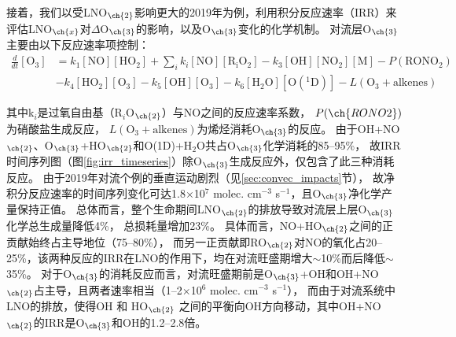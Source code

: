 
接着，我们以受LNO$_{\ch{2}}$影响更大的2019年为例，利用积分反应速率（IRR）来评估LNO$_{\ch{x}}$对$\Delta$O$_{\ch{3}}$的影响，以及O$_{\ch{3}}$变化的化学机制。
对流层O$_{\ch{3}}$主要由以下反应速率项控制\citep{Mazzuca.2016}：
{
\abovedisplayskip=3pt%
\belowdisplayskip=3pt%
\begingroup
\allowdisplaybreaks
\begin{align}
  \frac{d}{dt}[\mathrm{O_3}] &= k_1[\mathrm{NO}][\mathrm{HO_2}] + \sum_{i}  k_i[\mathrm{NO}][\mathrm{R_iO_2}] - k_3[\mathrm{OH}][\mathrm{NO_2}][\mathrm{M}] - P(\mathrm{RONO_2}) \nonumber \\
                             & - k_4[\mathrm{HO_2}][\mathrm{O_3}] - k_5[\mathrm{OH}][\mathrm{O_3}] - k_6[\mathrm{H_2O}][\mathrm{O(^1D)}] - L(\mathrm{O_3+alkenes})
\end{align}
\endgroup
}

其中k$_i$是过氧自由基（R$_i$O$_{\ch{2}}$）与NO之间的反应速率系数，
$P(\ch{RONO2})$为硝酸盐生成反应，
$L(\mathrm{O_3+alkenes})$为烯烃消耗O$_{\ch{3}}$的反应。
由于OH+NO$_{\ch{2}}$、O$_{\ch{3}}$+HO$_{\ch{2}}$和O(1D)+H$_2$O共占O$_{\ch{3}}$化学消耗的85--95\%，
故IRR时间序列图（图\ref{fig:irr_timeseries}）除O$_{\ch{3}}$生成反应外，仅包含了此三种消耗反应。
由于2019年对流个例的垂直运动剧烈（见\ref{sec:convec_impacts}节），
故净积分反应速率的时间序列变化可达1.8$\times$10$^7$ molec. cm$^{-3}$ s$^{-1}$，且O$_{\ch{3}}$净化学产量保持正值。
总体而言，整个生命期间LNO$_{\ch{2}}$的排放导致对流层上层O$_{\ch{3}}$化学总生成量降低4\%，
总损耗量增加23\%。
具体而言，NO+HO$_{\ch{2}}$之间的正贡献始终占主导地位（75--80\%），
而另一正贡献即RO$_{\ch{2}}$对NO的氧化占20--25\%，该两种反应的IRR在LNO的作用下，均在对流旺盛期增大$\sim$10\%而后降低$\sim$35\%。
对于O$_{\ch{3}}$的消耗反应而言，对流旺盛期前是O$_{\ch{3}}$+OH和OH+NO$_{\ch{2}}$占主导，且两者速率相当（1--2$\times$10$^6$ molec. cm$^{-3}$ s$^{-1}$），
而由于对流系统中LNO的排放，使得OH 和 HO$_{\ch{2}}$ 之间的平衡向OH方向移动，其中OH+NO$_{\ch{2}}$的IRR是O$_{\ch{3}}$和OH的1.2--2.8倍。


